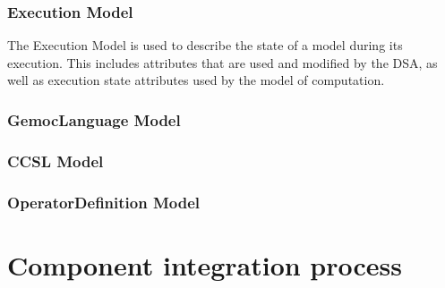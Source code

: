 \documentclass{gemoc} %
\begin{document}

\subsection{Execution Model}
The Execution Model is used to describe the state of a model during its execution. This includes attributes that are used and modified by the DSA, as well as execution state attributes used by the model of computation.

\subsection{GemocLanguage Model}


\subsection{CCSL Model}


\subsection{OperatorDefinition Model}



\chapter{Component integration process}

\end{document}
